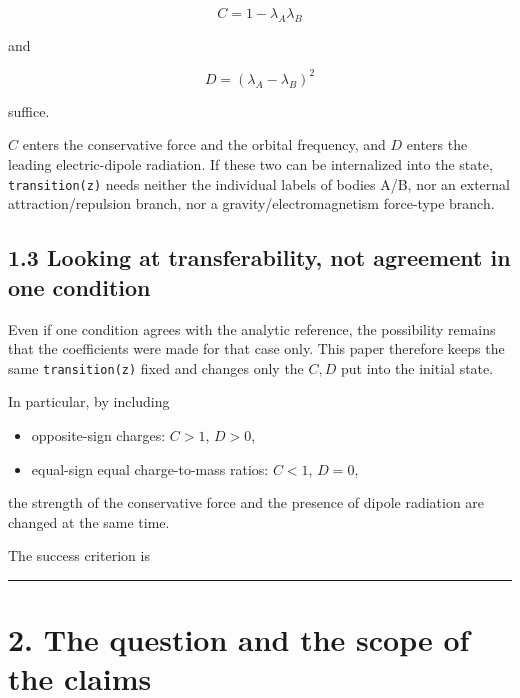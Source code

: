 \documentclass[
  a4paper,
]{article}
\providecommand{\tightlist}{%
  \setlength{\itemsep}{0pt}\setlength{\parskip}{0pt}}
\begin{document}
\[
\boxed{
C=1-\lambda_A\lambda_B
}
\]

and

\[
\boxed{
D=(\lambda_A-\lambda_B)^2
}
\]

suffice.

\(C\) enters the conservative force and the orbital frequency, and \(D\)
enters the leading electric-dipole radiation. If these two can be
internalized into the state, \texttt{transition(z)} needs neither the
individual labels of bodies A/B, nor an external attraction/repulsion
branch, nor a gravity/electromagnetism force-type branch.

\subsection{1.3 Looking at transferability, not agreement in one
condition}\label{looking-at-transferability-not-agreement-in-one-condition}

Even if one condition agrees with the analytic reference, the
possibility remains that the coefficients were made for that case only.
This paper therefore keeps the same \texttt{transition(z)} fixed and
changes only the \(C,D\) put into the initial state.

In particular, by including

\begin{itemize}
\tightlist
\item
  opposite-sign charges: \(C>1\), \(D>0\),
\item
  equal-sign equal charge-to-mass ratios: \(C<1\), \(D=0\),
\end{itemize}

the strength of the conservative force and the presence of dipole
radiation are changed at the same time.

The success criterion is

\begin{center}
\end{center}

\begin{center}\rule{0.5\linewidth}{0.5pt}\end{center}

\section{2. The question and the scope of the
claims}\label{the-question-and-the-scope-of-the-claims}
\end{document}

